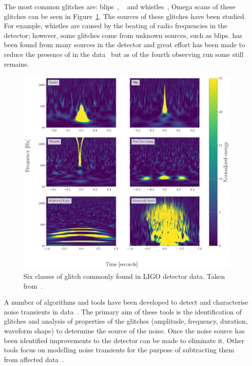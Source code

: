 The most common glitches are: blips~\cite{blips:2019}, \scl~\cite{ArchEnemy:2023} and whistles~\cite{glitschen:2021}, Omega scans of these glitches can be seen in Figure~\ref{3:fig:glitches_subset}. The sources of these glitches have been studied. For example, whistles are caused by the beating of radio frequencies in the detector; however, some glitches come from unknown sources, such as blips. \Scl has been found from many sources in the detector and great effort has been made to reduce the presence of \scl in the data~\cite{reducing_scattering:2020} but as of the fourth observing run some \scl still remains.
%
\begin{figure}
    \centering
    \includegraphics[width=1.0\linewidth]{images/3_detector_characterisation/glitches_subset.pdf}
    \caption{Six classes of glitch commonly found in LIGO detector data. Taken from~\cite{GlitchPlot:2024, gravityspy:2023}.}
    \label{3:fig:glitches_subset}
\end{figure}
%


A number of algorithms and tools have been developed to detect and characterise noise transients in \gwadj data~\cite{ArchEnemy:2023, reducing_scattering:2020, Glanzer:2023, gravityspy:2017, gravityspy:2021, gravityspy:2023, glitschen:2021,  BayesWave:2015, gwadaptive:2022, O3_subtraction:2022, Powell:2016, glitschen:2021}. The primary aim of these tools is the identification of glitches and analysis of properties of the glitches (amplitude, frequency, duration, waveform shape) to determine the source of the noise. Once the noise source has been identified improvements to the detector can be made to eliminate it. Other tools focus on modelling noise transients for the purpose of subtracting them from affected \gwadj data~\cite{ArchEnemy:2023, BayesWave:2015, glitschen:2021, antiglitch:2023}.
%
%

